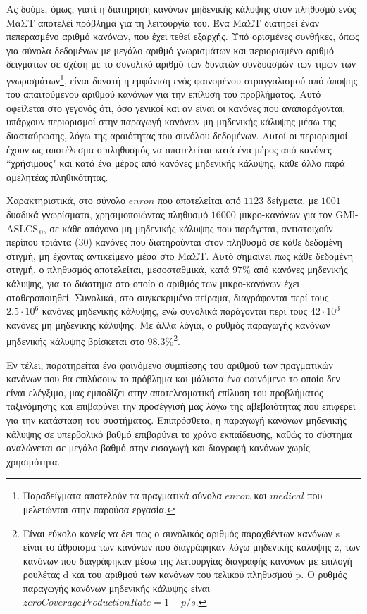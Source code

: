 Ας δούμε, όμως, γιατί η διατήρηση κανόνων μηδενικής κάλυψης στον πληθυσμό ενός ΜαΣΤ αποτελεί πρόβλημα για τη λειτουργία του. Ένα ΜαΣΤ διατηρεί έναν πεπερασμένο αριθμό κανόνων, που έχει τεθεί εξαρχής. Υπό ορισμένες συνθήκες, όπως για σύνολα δεδομένων με μεγάλο αριθμό γνωρισμάτων και περιορισμένο αριθμό δειγμάτων σε σχέση με το συνολικό αριθμό των δυνατών συνδυασμών των τιμών των γνωρισμάτων\footnote{Παραδείγματα αποτελούν τα πραγματικά σύνολα $enron$ και $medical$ που μελετώνται στην παρούσα εργασία.}, είναι δυνατή η εμφάνιση ενός φαινομένου στραγγαλισμού από άποψης του απαιτούμενου αριθμού κανόνων για την επίλυση του προβλήματος. Αυτό οφείλεται στο γεγονός ότι, όσο γενικοί και αν είναι οι κανόνες που αναπαράγονται, υπάρχουν περιορισμοί στην παραγωγή κανόνων μη μηδενικής κάλυψης μέσω της διασταύρωσης, λόγω της αραιότητας του συνόλου δεδομένων. Αυτοί οι περιορισμοί έχουν ως αποτέλεσμα ο πληθυσμός να αποτελείται κατά ένα μέρος από κανόνες “χρήσιμους" και κατά ένα μέρος από κανόνες μηδενικής κάλυψης, κάθε άλλο παρά αμελητέας πληθικότητας. 

Χαρακτηριστικά, στο σύνολο $enron$ που αποτελείται από $1123$ δείγματα, με $1001$ δυαδικά γνωρίσματα, χρησιμοποιώντας πληθυσμό $16000$ μικρο-κανόνων για τον GMl-ASLCS$_{\:0}$, σε κάθε απόγονο μη μηδενικής κάλυψης που παράγεται, αντιστοιχούν περίπου τριάντα ($30$) κανόνες που διατηρούνται στον πληθυσμό σε κάθε δεδομένη στιγμή, μη έχοντας αντικείμενο μέσα στο ΜαΣΤ. Αυτό σημαίνει πως κάθε δεδομένη στιγμή, ο πληθυσμός αποτελείται, μεσοσταθμικά, κατά $97\%$ από κανόνες μηδενικής κάλυψης, για το διάστημα στο οποίο ο αριθμός των μικρο-κανόνων έχει σταθεροποιηθεί. Συνολικά, στο συγκεκριμένο πείραμα, διαγράφονται περί τους $2.5 \cdot 10^{6}$ κανόνες μηδενικής κάλυψης, ενώ συνολικά παράγονται περί τους $42 \cdot 10^{3}$ κανόνες μη μηδενικής κάλυψης. Με άλλα λόγια, ο ρυθμός παραγωγής κανόνων μηδενικής κάλυψης βρίσκεται στο $98.3\%$\footnote{Είναι εύκολο κανείς να δει πως ο συνολικός αριθμός παραχθέντων κανόνων s είναι το άθροισμα των κανόνων που διαγράφηκαν λόγω μηδενικής κάλυψης z, των κανόνων που διαγράφηκαν μέσω της λειτουργίας διαγραφής κανόνων με επιλογή ρουλέτας d και του αριθμού των κανόνων του τελικού πληθυσμού p. Ο ρυθμός παραγωγής κανόνων μηδενικής κάλυψης είναι $zeroCoverageProductionRate=1-p/s$.}. 

Εν τέλει, παρατηρείται ένα φαινόμενο συμπίεσης του αριθμού των πραγματικών κανόνων που θα επιλύσουν το πρόβλημα και μάλιστα ένα φαινόμενο το οποίο δεν είναι ελέγξιμο, μας εμποδίζει στην αποτελεσματική επίλυση του προβλήματος ταξινόμησης και επιβαρύνει την προσέγγισή μας λόγω της αβεβαιότητας που επιφέρει για την κατάσταση του συστήματος. Επιπρόσθετα, η παραγωγή κανόνων μηδενικής κάλυψης σε υπερβολικό βαθμό επιβαρύνει το χρόνο εκπαίδευσης, καθώς το σύστημα αναλώνεται σε μεγάλο βαθμό στην εισαγωγή και διαγραφή κανόνων χωρίς χρησιμότητα. 

